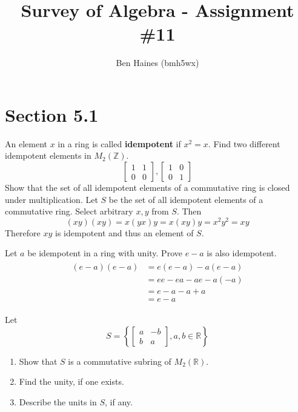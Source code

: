 \documentclass[paper=a4, fontsize=11pt]{jhwhw} %
\providecommand\given{} %
\begin{document}
\title{Survey of Algebra - Assignment \#11}
\author{Ben Haines (bmh5wx)}
\section*{Section 5.1}
An element $x$ in a ring is called \textbf{idempotent} if $x^2 = x$. Find two different idempotent elements in $M_2(\mathbb Z)$.
\solution
$$
\left[ \begin{array}{cc}
1 & 1 \\
0 & 0 \end{array} \right], 
\left[ \begin{array}{cc}
1 & 0 \\
0 & 1 \end{array} \right]
$$
Show that the set of all idempotent elements of a commutative ring is closed under multiplication.
\solution
Let $S$ be the set of all idempotent elements of a commutative ring. Select arbitrary $x, y$ from $S$. Then 
$$(xy)(xy) = x(yx)y = x(xy)y = x^2y^2 = xy$$
Therefore $xy$ is idempotent and thus an element of $S$.

Let $a$ be idempotent in a ring with unity. Prove $e - a$ is also idempotent.
\solution
\begin{align}
    \begin{split}
        (e-a)(e-a) &= e(e-a) - a(e-a)\\
                   &= ee - ea - ae - a(-a)\\
                   &= e - a - a + a\\
                   &= e - a
    \end{split}
\end{align}

Let
$$ S = \left\{
\left[ \begin{array}{cc}
a & -b \\
b & a \end{array} \right],
        \given a, b\in \mathbb R
\right\}
$$
\begin{enumerate}
    \item Show that $S$ is a commutative subring of $M_2(\mathbb R)$.
    \item Find the unity, if one exists.
    \item Describe the units in $S$, if any.
\end{enumerate}
\solution
\end{document}
